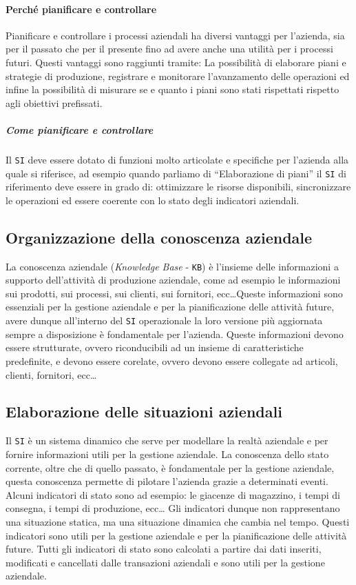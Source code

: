         \paragraph{Perché pianificare e controllare} Pianificare e controllare i processi aziendali ha diversi vantaggi per l'azienda, sia per il passato che per il presente fino ad avere anche una utilità per i processi futuri. Questi vantaggi sono raggiunti tramite: La possibilità di elaborare piani e strategie di produzione, registrare e monitorare l'avanzamento delle operazioni ed infine la possibilità di misurare se e quanto i piani sono stati rispettati rispetto agli obiettivi prefissati.
            \subparagraph{Come pianificare e controllare} Il \texttt{SI} deve essere dotato di funzioni molto articolate e specifiche per l'azienda alla quale si riferisce, ad esempio quando parliamo di ``Elaborazione di piani'' il \texttt{SI} di riferimento deve essere in grado di: ottimizzare le risorse disponibili, sincronizzare le operazioni ed essere coerente con lo stato degli indicatori aziendali.
    \subsection{Organizzazione della conoscenza aziendale}
        La conoscenza aziendale (\textit{Knowledge Base} - \texttt{KB}) è l'insieme delle informazioni a supporto dell'attività di produzione aziendale, come ad esempio le informazioni sui prodotti, sui processi, sui clienti, sui fornitori, ecc\dots Queste informazioni sono essenziali per la gestione aziendale e per la pianificazione delle attività future, avere dunque all'interno del \texttt{SI} operazionale la loro versione più aggiornata sempre a disposizione è fondamentale per l'azienda.\newline
        Queste informazioni devono essere strutturate, ovvero riconducibili ad un insieme di caratteristiche predefinite, e devono essere corelate, ovvero devono essere collegate ad articoli, clienti, fornitori, ecc\dots
    \subsection{Elaborazione delle situazioni aziendali}
        Il \texttt{SI} è un sistema dinamico che serve per modellare la realtà aziendale e per fornire informazioni utili per la gestione aziendale. La conoscenza dello stato corrente, oltre che di quello passato, è fondamentale per la gestione aziendale, questa conoscenza permette di pilotare l'azienda grazie a determinati eventi. Alcuni indicatori di stato sono ad esempio: le giacenze di magazzino, i tempi di consegna, i tempi di produzione, ecc\dots\newline
        Gli indicatori dunque non rappresentano una situazione statica, ma una situazione dinamica che cambia nel tempo. Questi indicatori sono utili per la gestione aziendale e per la pianificazione delle attività future. Tutti gli indicatori di stato sono calcolati a partire dai dati inseriti, modificati e cancellati dalle transazioni aziendali e sono utili per la gestione aziendale.
